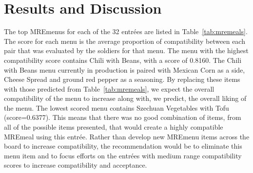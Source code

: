 \section{Results and Discussion}
The top MRE\tm menus for each of the 32 entr\'{e}es are listed in Table~\ref{tab:mremeals}.  The score for each menu is the average proportion of compatibility between each pair that was evaluated by the soldiers for that menu.  The menu with the highest compatibility score contains Chili with Beans, with a score of 0.8160.  The  Chili with Beans menu currently in production is paired with Mexican Corn as a side, Cheese Spread and ground red pepper as a seasoning.  By replacing these items with those predicted from Table~\ref{tab:mremeals}, we expect the overall compatibility of the menu to increase along with, we predict, the overall liking of the menu.  The lowest scored menu contains Szechuan Vegetables with Tofu (score=0.6377).  This means that there was no good combination of items, from all of the possible items presented, that would create a highly compatible MRE\tm meal using this entr\'{e}e.  Rather than develop new MRE\tm menu items across the board to increase compatibility, the recommendation would be to eliminate this menu item and to focus efforts on the entr\'{e}es with medium range compatibility scores to increase compatibility and acceptance.

